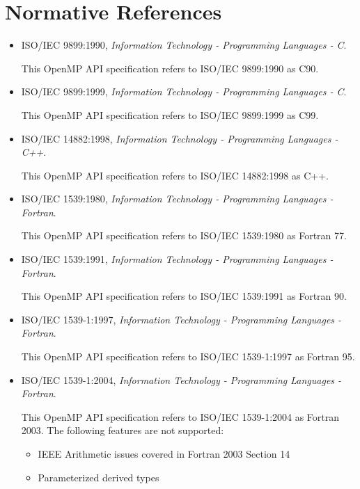 \section{Normative References}
\label{sec:normative references}
\begin{itemize}
\item ISO/IEC 9899:1990, \textsl{Information Technology - Programming Languages - C}.

This OpenMP API specification refers to ISO/IEC 9899:1990 as C90.

\item ISO/IEC 9899:1999, \textsl{Information Technology - Programming Languages - C}. 

This OpenMP API specification refers to ISO/IEC 9899:1999 as C99.

\item ISO/IEC 14882:1998, \textsl{Information Technology - Programming Languages - C++}. 

This OpenMP API specification refers to ISO/IEC 14882:1998 as C++.

\item ISO/IEC 1539:1980, \textsl{Information Technology - Programming Languages - Fortran}.

This OpenMP API specification refers to ISO/IEC 1539:1980 as Fortran 77.

\item ISO/IEC 1539:1991, \textsl{Information Technology - Programming Languages - Fortran}.

This OpenMP API specification refers to ISO/IEC 1539:1991 as Fortran 90.

\item ISO/IEC 1539-1:1997, \textsl{Information Technology - Programming Languages - Fortran}.

This OpenMP API specification refers to ISO/IEC 1539-1:1997 as Fortran 95.

\item ISO/IEC 1539-1:2004, \textsl{Information Technology - Programming Languages - Fortran}.


This OpenMP API specification refers to ISO/IEC 1539-1:2004 as Fortran 2003. The 
following features are not supported:

\begin{itemize}
\item IEEE Arithmetic issues covered in Fortran 2003 Section 14

\item Parameterized derived types


\end{itemize}
\end{itemize}
